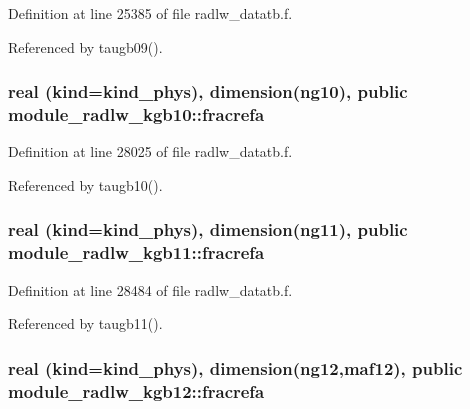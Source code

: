 Definition at line 25385 of file radlw\+\_\+datatb.\+f.



Referenced by taugb09().

\subsubsection[{\texorpdfstring{fracrefa}{fracrefa}}]{\setlength{\rightskip}{0pt plus 5cm}real (kind=kind\+\_\+phys), dimension(ng10), public module\+\_\+radlw\+\_\+kgb10\+::fracrefa}\hypertarget{group__module__radlw__main_gaa8bbfdaf370e12ae26d2ee3c464bdbc2}{}\label{group__module__radlw__main_gaa8bbfdaf370e12ae26d2ee3c464bdbc2}


Definition at line 28025 of file radlw\+\_\+datatb.\+f.



Referenced by taugb10().

\subsubsection[{\texorpdfstring{fracrefa}{fracrefa}}]{\setlength{\rightskip}{0pt plus 5cm}real (kind=kind\+\_\+phys), dimension(ng11), public module\+\_\+radlw\+\_\+kgb11\+::fracrefa}\hypertarget{group__module__radlw__main_ga5bf6552fb9c1e7c35729b2aea885306e}{}\label{group__module__radlw__main_ga5bf6552fb9c1e7c35729b2aea885306e}


Definition at line 28484 of file radlw\+\_\+datatb.\+f.



Referenced by taugb11().

\subsubsection[{\texorpdfstring{fracrefa}{fracrefa}}]{\setlength{\rightskip}{0pt plus 5cm}real (kind=kind\+\_\+phys), dimension(ng12,maf12), public module\+\_\+radlw\+\_\+kgb12\+::fracrefa}\hypertarget{group__module__radlw__main_ga58ff4f54c11eb12f7ab5157823981b16}{}\label{group__module__radlw__main_ga58ff4f54c11eb12f7ab5157823981b16}



